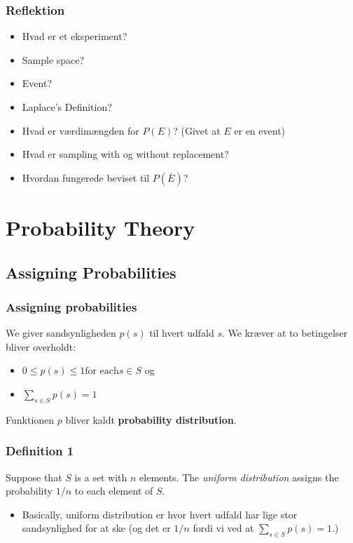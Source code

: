 \documentclass{beamer}
\begin{document}
\begin{frame}
  \frametitle{Reflektion}
  \begin{itemize}
  \item Hvad er et eksperiment?
  \item Sample space?
  \item Event?
  \item Laplace's Definition?
  \item Hvad er værdimængden for $P(E)$? (Givet at $E$ er en event)
  \item Hvad er sampling with og without replacement?
  \item Hvordan fungerede beviset til $P(\overline{E})$?
  \end{itemize} 
\end{frame}

\section{Probability Theory}
\label{sec:probability-theortheory}

\subsection{Assigning Probabilities}
\label{subsec:assigning-probabilities}


\begin{frame}
  \frametitle{Assigning probabilities}
  We giver sandsynligheden $p(s)$ til hvert udfald $s$. We kræver at to betingelser bliver overholdt:
  \begin{itemize}
  \item $0 \leq p(s) \leq 1 \text{for each} s \in S$ og
  \item $\sum_{s \in S}p(s) = 1$
  \end{itemize}
  Funktionen $p$ bliver kaldt \textbf{probability distribution}.
\end{frame}

\begin{frame}
  \frametitle{Definition 1}
  \begin{definition}
    Suppose that $S$ is a set with $n$ elements. The \textit{uniform distribution} assigns the probability $1/n$ to each element of $S$.
  \end{definition}
  \begin{itemize}
  \item Basically, uniform distribution er hvor hvert udfald har lige stor sandsynlighed for at ske (og det er $1/n$ fordi vi ved at $\sum_{s \in S}^{}p(s) = 1$.)
  \end{itemize} 
\end{frame}
\end{document}
